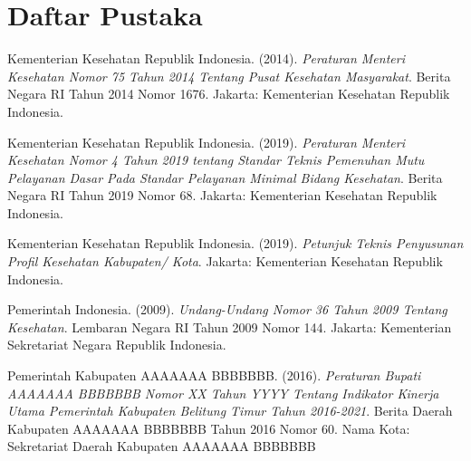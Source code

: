 
\chapter*{Daftar Pustaka}

    \indent\indent Kementerian Kesehatan Republik Indonesia. (2014). \emph{Peraturan Menteri Kesehatan Nomor 75 Tahun 2014 Tentang Pusat Kesehatan Masyarakat}. Berita Negara RI Tahun 2014 Nomor 1676. Jakarta: Kementerian Kesehatan Republik Indonesia.
    
    Kementerian Kesehatan Republik Indonesia. (2019). \emph{Peraturan Menteri Kesehatan Nomor 4 Tahun 2019 tentang Standar Teknis Pemenuhan Mutu Pelayanan Dasar Pada Standar Pelayanan Minimal Bidang Kesehatan}. Berita Negara RI Tahun 2019 Nomor 68. Jakarta: Kementerian Kesehatan Republik Indonesia.

    Kementerian Kesehatan Republik Indonesia. (2019). \emph{Petunjuk Teknis Penyusunan Profil Kesehatan Kabupaten/ Kota}. Jakarta: Kementerian Kesehatan Republik Indonesia.
    
    Pemerintah Indonesia. (2009). \emph{Undang-Undang Nomor 36 Tahun 2009 Tentang Kesehatan}. Lembaran Negara RI Tahun 2009 Nomor 144. Jakarta: Kementerian Sekretariat Negara Republik Indonesia.
    
    Pemerintah Kabupaten AAAAAAA BBBBBBB. (2016). \emph{Peraturan Bupati AAAAAAA BBBBBBB Nomor XX Tahun YYYY Tentang Indikator Kinerja Utama Pemerintah Kabupaten Belitung Timur Tahun 2016-2021}. Berita Daerah Kabupaten AAAAAAA BBBBBBB Tahun 2016 Nomor 60. Nama Kota: Sekretariat Daerah Kabupaten AAAAAAA BBBBBBB

